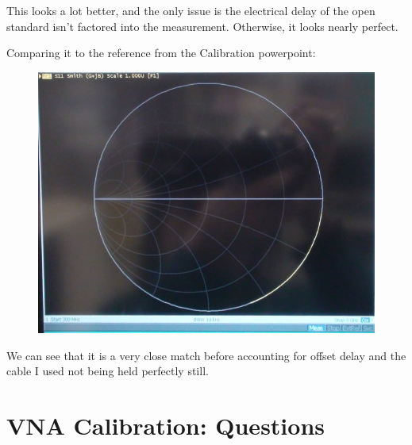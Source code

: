 \documentclass[11pt]{article}
\begin{document}
This looks a lot better, and the only issue is the electrical delay of the open standard isn't factored into the measurement. Otherwise, it looks nearly perfect.

Comparing it to the reference from the Calibration powerpoint:

\begin{figure}[H]
	\centering \includegraphics[width=\linewidth-6cm]{images/S11_OPEN_STD_REFERENCE.JPG}
\end{figure}

We can see that it is a very close match before accounting for offset delay and the cable I used not being held perfectly still.


\section{VNA Calibration: Questions}
\end{document}
